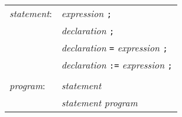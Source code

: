 \begin{center}\begin{tabular}{l l}
\emph{statement}: & \emph{expression} \texttt{;}\\
& \emph{declaration} \texttt{;}\\
& \emph{declaration} \texttt{=} \emph{expression} \texttt{;}\\
& \emph{declaration} \texttt{:=} \emph{expression} \texttt{;}\\
\\
\emph{program}: & \emph{statement}\\
& \emph{statement} \emph{program}\\
\end{tabular}\end{center}


